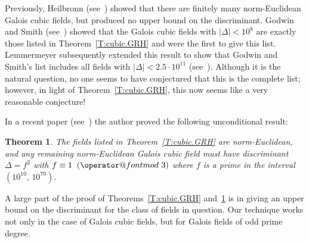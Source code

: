 \documentclass{amsart}
\newtheorem{theorem}{Theorem}[section]
\numberwithin{equation}{section}
\numberwithin{table}{section}
\begin{document}
Previously, Heilbronn (see~\cite{heilbronn:cubic}) showed that there are finitely many norm-Euclidean Galois cubic fields, but produced no upper
bound on the discriminant.  Godwin and Smith (see~\cite{godwin.smith:1993}) showed that the Galois cubic fields with $|\Delta|<10^8$ are exactly those listed in Theorem~\ref{T:cubic.GRH}
and were the first to give this list.  Lemmermeyer subsequently extended this result to show that
Godwin and Smith's list includes all fields with $|\Delta|<2.5\cdot 10^{11}$ (see~\cite{lemmermeyer:euclidean}).
Although it is the natural question, no one seems to have conjectured that this is the complete list;
however,
in light of Theorem~\ref{T:cubic.GRH}, this now seems like a very reasonable conjecture!

In a recent paper (see~\cite{mcgown:euclidean}) the author proved the
following unconditional result:
\begin{theorem}\label{T:cubic}
The
fields listed in Theorem~\ref{T:cubic.GRH} are norm-Euclidean, and
any remaining norm-Euclidean Galois cubic field
must have discriminant
$\Delta=f^2$ with $f\equiv 1{\allowbreak\mkern10mu({\operator@font mod}\,\,{3})}$
where $f$
is a prime in the interval $(10^{10},\,10^{70})$.
\end{theorem}
A large part of the proof of Theorems~\ref{T:cubic.GRH} and~\ref{T:cubic}
is in giving an upper bound on the discriminant for the class of fields in question.
Our technique works not only in the case of Galois cubic fields,
but for Galois fields of odd prime degree.
\end{document}
